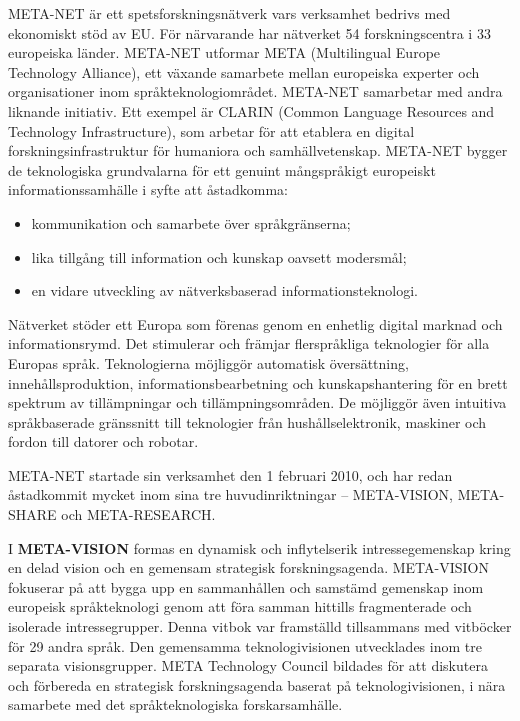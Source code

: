 \begin{multicols}{2}

META-NET är ett spets\-forsk\-nings\-nätverk vars verksamhet bedrivs
med ekonomiskt stöd av EU. För närvarande har nätverket 54 forsk\-nings\-centra i
33 europeiska länder. META-NET utformar META (Multilingual Europe
Technology Alliance), ett växande samarbete mellan europeiska experter
och organisationer inom språkteknologi\-området. META-NET samarbetar
med andra liknande initiativ. Ett exempel är CLARIN (Common Language
Resources and Technology Infrastructure), som arbetar för att etablera
en digital forsknings\-infrastruktur för humaniora och
samhällvetenskap. META-NET bygger de teknologiska grundvalarna för ett
genuint mångspråkigt europeiskt informations\-samhälle i syfte att
åstadkomma:

\begin{itemize}[itemsep=0pt,parsep=0pt]
\item kommunikation och samarbete över språkgränserna;
\item lika tillgång till information och kunskap oavsett modersmål;
\item en vidare utveckling av nätverksbaserad informationsteknologi.
\end{itemize}

Nätverket stöder ett Europa som förenas genom en enhetlig digital marknad och informationsrymd. Det stimulerar och främjar flerspråkliga teknologier för alla Europas språk. Teknologierna möjliggör automatisk översättning, innehållsproduktion, informationsbearbetning och kunskapshantering för en brett spektrum av tillämpningar och tillämpningsområden. De möjliggör även intuitiva språkbaserade gränssnitt till teknologier från hushållselektronik, maskiner och fordon till datorer och robotar.

META-NET startade sin verksamhet den 1 februari 2010, och har redan åstadkommit mycket inom sina tre huvudinriktningar -- META-VISION, META-SHARE och META-RESEARCH.

I \textbf{META-VISION} formas en dynamisk och inflytelserik
intressegemenskap kring en delad vision och en gemensam strategisk
forskningsagenda. META-VISION fokuserar på att bygga upp en
sammanhållen och samstämd gemenskap inom europeisk språkteknologi
genom att föra samman hittills fragmenterade och isolerade
intressegrupper. Denna vitbok var framställd tillsammans med vitböcker för 29 andra språk. Den gemensamma teknologivisionen utvecklades inom tre separata visionsgrupper. META Technology Council bildades för att diskutera och förbereda en strategisk forskningsagenda baserat på teknologivisionen, i nära samarbete med det språkteknologiska forskarsamhälle.


\end{multicols}
